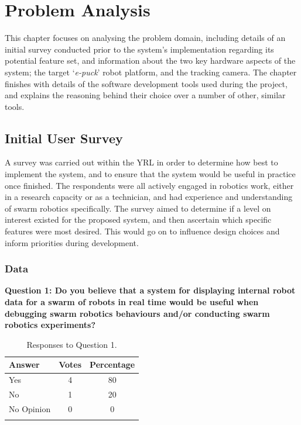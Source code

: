 \chapter[Problem Analysis]{Problem Analysis} %

\label{ChapterProblemAnalysis} %

This chapter focuses on analysing the problem domain, including details of an initial survey conducted prior to the system's implementation regarding its potential feature set, and information about the two key hardware aspects of the system; the target `\textit{e-puck}' robot platform, and the tracking camera. The chapter finishes with details of the software development tools used during the project, and explains the reasoning behind their choice over a number of other, similar tools.


\section{Initial User Survey}

A survey was carried out within the YRL in order to determine how best to implement the system, and to ensure that the system would be useful in practice once finished. The respondents were all actively engaged in robotics work, either in a research capacity or as a technician, and had experience and understanding of swarm robotics specifically. The survey aimed to determine if a level on interest existed for the proposed system, and then ascertain which specific features were most desired. This would go on to influence design choices and inform priorities during development.


\subsection{Data}
\noindent\textbf{Question 1: Do you believe that a system for displaying internal robot data for a swarm of robots in real time would be useful when debugging swarm robotics behaviours and/or conducting swarm robotics experiments?}

\begin{longtable}{ l c c }
 \textbf{Answer} & \textbf{Votes} & \textbf{Percentage} \\ 
 \hline
 Yes & 4 & 80 \\ 
 No & 1 & 20 \\
 No Opinion & 0 & 0 \\
 \bottomrule
 \caption{Responses to Question 1.}
 \label{tab:QuestionOneData}
\end{longtable}

